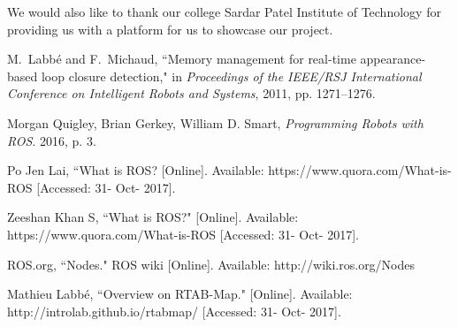 \documentclass[journal]{IEEEtran}
\begin{document}
We would also like to thank our college Sardar Patel Institute of Technology for providing us with a platform for us to showcase our project.


\ifCLASSOPTIONcaptionsoff
  \newpage
\fi





%
%
%
\begin{thebibliography}{1}

M.~Labbé and F.~Michaud, ``Memory management for real-time appearance-based loop closure detection,"
in \emph{Proceedings of the IEEE/RSJ International Conference on Intelligent Robots and Systems}, 2011, pp. 1271–1276.

Morgan Quigley, Brian Gerkey, William D. Smart, \emph{Programming Robots with ROS}. 2016, p. 3.

Po Jen Lai, ``What is ROS? [Online]. Available: 
https://www.quora.com/What-is-ROS
[Accessed: 31- Oct- 2017].

Zeeshan Khan S, ``What is ROS?" [Online]. Available: 
https://www.quora.com/What-is-ROS
[Accessed: 31- Oct- 2017].

ROS.org, ``Nodes." ROS wiki [Online]. Available: http://wiki.ros.org/Nodes

Mathieu Labbé, ``Overview on RTAB-Map." [Online]. Available: 
http://introlab.github.io/rtabmap/
[Accessed: 31- Oct- 2017].

\end{thebibliography}
\end{document}
